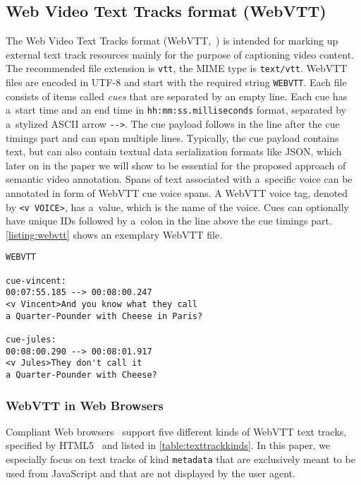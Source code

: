 \documentclass{sig-alternate}
\begin{document}
\subsection{Web Video Text Tracks format (WebVTT)}

The Web Video Text Tracks format (WebVTT,~\cite{pfeiffer2013webvtt})
is intended for marking up external text track resources mainly
for the purpose of captioning video content.
The recommended file extension is \texttt{vtt},
the MIME type is \texttt{text/vtt}.
WebVTT files are encoded in UTF-8 and
start with the required string \texttt{WEBVTT}.
Each file consists of items called \emph{cues}
that are separated by an empty line.
Each cue has a~start time and an end time in
\texttt{hh:mm:ss.milliseconds} format,
separated by a~stylized ASCII arrow \texttt{-}\texttt{->}.
The cue payload follows in the line after the cue timings part
and can span multiple lines.
Typically, the cue payload contains text,
but can also contain textual data serialization formats like JSON,
which later on in the paper we will show to be essential
for the proposed approach of semantic video annotation.
Spans of text associated with a~specific voice can be annotated
in form of WebVTT cue voice spans.
A WebVTT voice tag, denoted by \texttt{<v VOICE>}, has a~value,
which is the name of the voice.
Cues can optionally have unique IDs
followed by a~colon in the line
above the cue timings part.
\autoref{listing:webvtt} shows an exemplary WebVTT file.

\begin{lstlisting}[caption={Sample WebVTT file with two cues
    with the IDs \texttt{cue-vincent} and
    \texttt{cue-jules} respectively},
  label=listing:webvtt, float=h!]
WEBVTT

cue-vincent:
00:07:55.185 --> 00:08:00.247
<v Vincent>And you know what they call
a Quarter-Pounder with Cheese in Paris?

cue-jules:
00:08:00.290 --> 00:08:01.917
<v Jules>They don't call it
a Quarter-Pounder with Cheese?
\end{lstlisting}

\subsubsection{WebVTT in Web Browsers}

Compliant Web browsers~\cite{dutton2012trackelement}
support five different kinds of
WebVTT text tracks, specified by HTML5~\cite{berjon2013html5}
and listed in \autoref{table:texttrackkinds}.
In this paper, we especially focus on
text tracks of kind \texttt{metadata}
that are exclusively meant to be used from JavaScript and
that are not displayed by the user agent.
\end{document}
